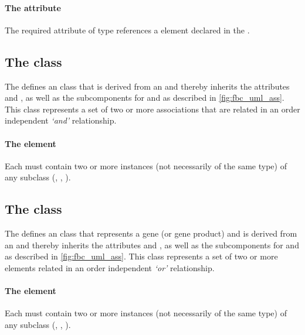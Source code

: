 
\paragraph{The  attribute}
The required  attribute of type %
references a \GeneProduct element declared in the \ListOfGeneProducts.
\pagebreak
\subsection{The \FBC {} class}
\label{and-class}

The \FBCPackage defines an \GeneAnd class that is derived from
an \Association and thereby inherits the \SBase attributes 
and , as well as the subcomponents for \Annotation and
\Notes as described in \ref{fig:fbc_uml_ass}. This class represents a
set of two or more associations that are related in an order independent
\emph{`and'} relationship.

\paragraph{The  element}
Each \GeneAnd must contain two or more instances (not necessarily of
the same type) of any \Association subclass (\GeneAnd, \GeneOr,
\GeneProductRef).


\subsection{The \FBC {} class}
\label{or-class}

The \FBCPackage defines an \GeneOr class that represents a gene
(or gene product) and is derived from an \Association and thereby inherits
the \SBase attributes  and , as well as the
subcomponents for \Annotation and \Notes as described in \ref{fig:fbc_uml_ass}.
This class represents a set of two or more \Association elements related
in an order independent \emph{`or'} relationship.

\paragraph{The  element}
Each \GeneOr must contain two or more instances (not necessarily of the
same type) of any \Association subclass (\GeneAnd, \GeneOr, \GeneProductRef).
%
